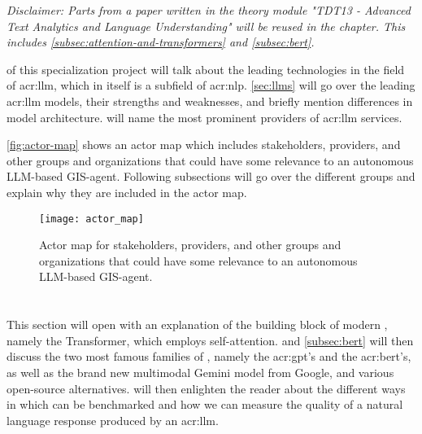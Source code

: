 \textit{Disclaimer: Parts from a paper written in the theory module "TDT13 - Advanced Text Analytics and Language Understanding" will be reused in the  chapter. This includes \autoref{subsec:attention-and-transformers} and \autoref{subsec:bert}.}

\vspace{12pt}

 of this specialization project will talk about the leading technologies in the field of \gls{acr:llm}, which in itself is a subfield of \gls{acr:nlp}. \autoref{sec:llms} will go over the leading \gls{acr:llm} models, their strengths and weaknesses, and briefly mention differences in model architecture.  will name the most prominent providers of \gls{acr:llm} services.

\autoref{fig:actor-map} shows an actor map which includes stakeholders, providers, and other groups and organizations that could have some relevance to an autonomous LLM-based GIS-agent. Following subsections will go over the different groups and explain why they are included in the actor map.

\begin{figure}
    \texttt{[image: actor\_map]}
    \caption{Actor map for stakeholders, providers, and other groups and organizations that could have some relevance to an autonomous LLM-based GIS-agent.}
    \label{fig:actor-map}
\end{figure}

\section[Large Language Models]{}\label{sec:llms}

This section will open with an explanation of the building block of modern , namely the Transformer, which employs self-attention.  and \autoref{subsec:bert} will then discuss the two most famous families of , namely the \acrshort{acr:gpt}'s and the \acrshort{acr:bert}'s, as well as the brand new multimodal Gemini model from Google, and various open-source alternatives.  will then enlighten the reader about the different ways in which  can be benchmarked and how we can measure the quality of a natural language response produced by an \acrshort{acr:llm}.

